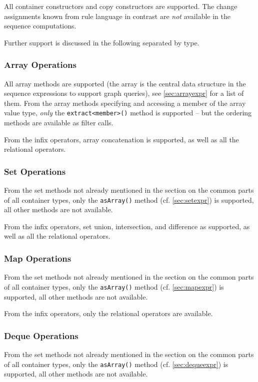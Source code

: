 All container constructors and copy constructors are supported.
The change assignments known from rule language in contrast are \emph{not} available in the sequence computations.

Further support is discussed in the following separated by type.

\subsubsection*{Array Operations}
All array methods are supported (the array is the central data structure in the sequence expressions to support graph queries), see \ref{sec:arrayexpr} for a list of them.
From the array methods specifying and accessing a member of the array value type, \emph{only} the \texttt{extract<member>()} method is supported -- but the ordering methods are available as filter calls.

From the infix operators, array concatenation is supported, as well as all the relational operators.

\subsubsection*{Set Operations}
From the set methods not already mentioned in the section on the common parts of all container types, only the \texttt{asArray()} method (cf. \ref{sec:setexpr}) is supported, all other methods are not available.

From the infix operators, set union, intersection, and difference as supported, as well as all the relational operators.

\subsubsection*{Map Operations}
From the set methods not already mentioned in the section on the common parts of all container types, only the \texttt{asArray()} method (cf. \ref{sec:mapexpr}) is supported, all other methods are not available.

From the infix operators, only the relational operators are available.

\subsubsection*{Deque Operations}
From the set methods not already mentioned in the section on the common parts of all container types, only the \texttt{asArray()} method (cf. \ref{sec:dequeexpr}) is supported, all other methods are not available.

